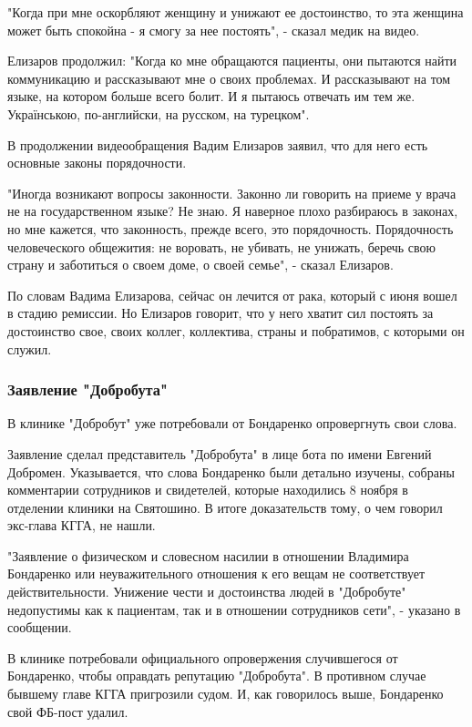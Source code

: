 "Когда при мне оскорбляют женщину и унижают ее достоинство, то эта женщина
может быть спокойна - я смогу за нее постоять", - сказал медик на видео. 

Елизаров продолжил: "Когда ко мне обращаются пациенты, они пытаются найти
коммуникацию и рассказывают мне о своих проблемах. И рассказывают на том языке,
на котором больше всего болит. И я пытаюсь отвечать им тем же. Українською,
по-английски, на русском, на турецком". 

В продолжении видеообращения Вадим Елизаров заявил, что для него есть основные
законы порядочности. 

"Иногда возникают вопросы законности. Законно ли говорить на приеме у врача не
на государственном языке? Не знаю. Я наверное плохо разбираюсь в законах, но
мне кажется, что законность, прежде всего, это порядочность. Порядочность
человеческого общежития: не воровать, не убивать, не унижать, беречь свою
страну и заботиться о своем доме, о своей семье", - сказал Елизаров.

По словам Вадима Елизарова, сейчас он лечится от рака, который с июня вошел в
стадию ремиссии. Но Елизаров говорит, что у него хватит сил постоять за
достоинство свое, своих коллег, коллектива, страны и побратимов, с которыми он
служил. 

\subsubsection{Заявление "Добробута" }

В клинике "Добробут" уже потребовали от Бондаренко опровергнуть свои слова. 

Заявление сделал представитель "Добробута" в лице бота по имени Евгений
Добромен. Указывается, что слова Бондаренко были детально изучены, собраны
комментарии сотрудников и свидетелей, которые находились 8 ноября в отделении
клиники на Святошино. В итоге доказательств тому, о чем говорил экс-глава КГГА,
не нашли. 

"Заявление о физическом и словесном насилии в отношении Владимира Бондаренко
или неуважительного отношения к его вещам не соответствует действительности.
Унижение чести и достоинства людей в "Добробуте" недопустимы как к пациентам,
так и в отношении сотрудников сети", - указано в сообщении.

В клинике потребовали официального опровержения случившегося от Бондаренко,
чтобы оправдать репутацию "Добробута". В противном случае бывшему главе КГГА
пригрозили судом. И, как говорилось выше, Бондаренко свой ФБ-пост удалил. 

